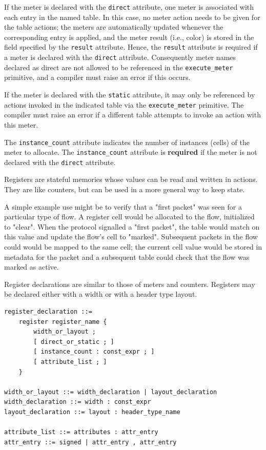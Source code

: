 \documentclass[12pt]{article}
\begin{document}
If the meter is declared with the \texttt{direct} attribute, one meter
is associated with each entry in the named table. In this case, no 
meter action needs to be given for the table actions; the meters are 
automatically updated whenever the corresponding entry is applied,
and the meter result (i.e., color) is stored in the field specified 
by the \texttt{result} attribute. Hence, the \texttt{result} attribute
is required if a meter is declared with the \texttt{direct} attribute.
Consequently meter names declared as direct are not allowed to be 
referenced in the \texttt{execute_meter} primitive, and a compiler must
raise an error if this occurs. 

If the meter is declared with the \texttt{static} attribute, it may only
be referenced by actions invoked in the indicated table via the \texttt{execute_meter}
primitive. The compiler must raise an error if a different table 
attempts to invoke an action with this meter.

The \texttt{instance_count} attribute indicates the number of
instances (cells) of the meter to allocate.  The
\texttt{instance_count} attribute is \textbf{required} if the meter
is not declared with the \texttt{direct} attribute.


Registers are stateful memories whose values can be read and written
in actions.  They are like counters, but can be used in a more general
way to keep state.

A simple example use might be to verify that a "first packet" was seen
for a particular type of flow. A register cell would be allocated to
the flow, initialized to "clear". When the protocol signalled a "first
packet", the table would match on this value and update the flow's
cell to "marked".  Subsequent packets in the flow could would be
mapped to the same cell; the current cell value would be stored in
metadata for the packet and a subsequent table could check that the
flow was marked as active.

Register declarations are similar to those of meters and
counters. Registers may be declared either with a width or with a
header type layout.

\begin{lstlisting}[style=BNFstyle]
register_declaration ::= 
    register register_name {
        width_or_layout ;
        [ direct_or_static ; ]
        [ instance_count : const_expr ; ]
        [ attribute_list ; ]
    }

width_or_layout ::= width_declaration | layout_declaration
width_declaration ::= width : const_expr
layout_declaration ::= layout : header_type_name

attribute_list ::= attributes : attr_entry
attr_entry ::= signed | attr_entry , attr_entry
\end{lstlisting}
\end{document}
